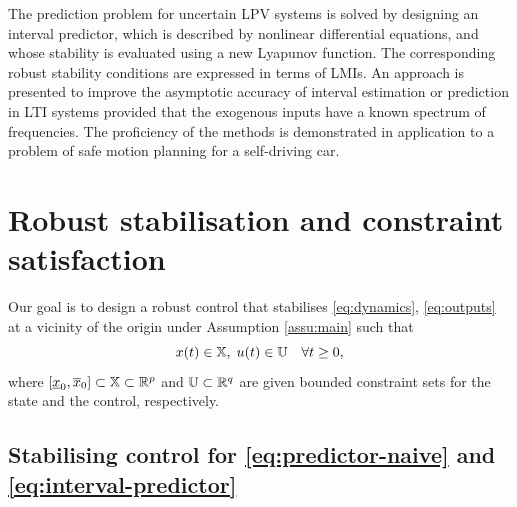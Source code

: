 The prediction problem for uncertain LPV systems is solved by designing an interval predictor, which is described by nonlinear differential equations, and whose stability is evaluated using a new Lyapunov function. The corresponding robust stability conditions are expressed in terms of LMIs. An approach is presented to improve the asymptotic accuracy of interval estimation or prediction in LTI systems provided that the exogenous inputs have a known spectrum of frequencies. The proficiency of the methods is demonstrated in application to a problem of safe motion planning for a self-driving car.



\section{Robust stabilisation and constraint satisfaction}
\label{sec:robust-stabilisation}

Our goal is to design a robust control that stabilises \eqref{eq:dynamics},
\eqref{eq:outputs} at a vicinity of the origin under Assumption \ref{assu:main}
such that
\begin{equation}
x(t)\in\mathbb{X},\;u(t)\in\mathbb{U}\quad\forall t\geq0,\label{eq:constraints}
\end{equation}
where $[\underline{x}_{0},\overline{x}_{0}]\subset\mathbb{X}\subset\mathbb{R}^{p}$
and $\mathbb{U}\subset\mathbb{R}^{q}$ are given bounded constraint sets for the
state and the control, respectively.


\subsection{Stabilising control for \eqref{eq:predictor-naive} and \eqref{eq:interval-predictor}}

